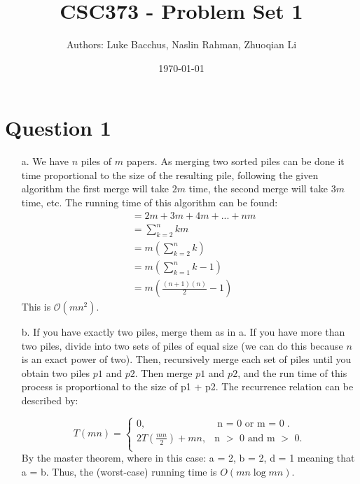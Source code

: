 \documentclass[12pt]{article}
\title{\textbf{CSC373 - Problem Set 1}}
\author{Authors: Luke Bacchus, Naslin Rahman, Zhuoqian Li}
\date{\today}
\begin{document}
\maketitle
\section*{Question 1}
\begin{enumerate}
    \item[a.] We have $n$ piles of $m$ papers. As merging two sorted piles can be done it time proportional to the size of the resulting pile, following the given algorithm the first merge will take $2m$ time, the second merge will take $3m$ time, etc. 
    The running time of this algorithm can be found:
    \begin{align*}
        &= 2m + 3m + 4m + ... + nm \\
        &= \sum_{k=2}^n km \\
        &= m(\sum_{k=2}^n k) \\
        &= m(\sum_{k=1}^n k-1) \\
        &= m(\frac{(n+1)(n)}{2} - 1)
    \end{align*}
    This is $\mathcal{O}(mn^2)$.
    \item[b.] If you have exactly two piles, merge them as in a. If you have more than two piles, divide into two sets of piles of equal size (we can do this because $n$ is an exact power of two). 
    Then, recursively merge each set of piles until you obtain two piles $p1$ and $p2$. Then merge $p1$ and $p2$, and the run time of this process is proportional to the size of p1 + p2. The recurrence relation can be described by:
    
    \begin{equation}
        T(mn) = \begin{cases}
          0, & \text{n = 0 or m $=$ 0}.\\
          2T(\frac{mn}{2}) + mn, & \text{n $>$ 0 and m $>$ 0}.\\
    \end{cases}
    \end{equation}
By the master theorem, where in this case: a = 2, b = 2, d = 1 meaning that a = b. Thus, the (worst-case) running time is $O(mn \log mn)$.\end{enumerate}
\newpage
\end{document}
